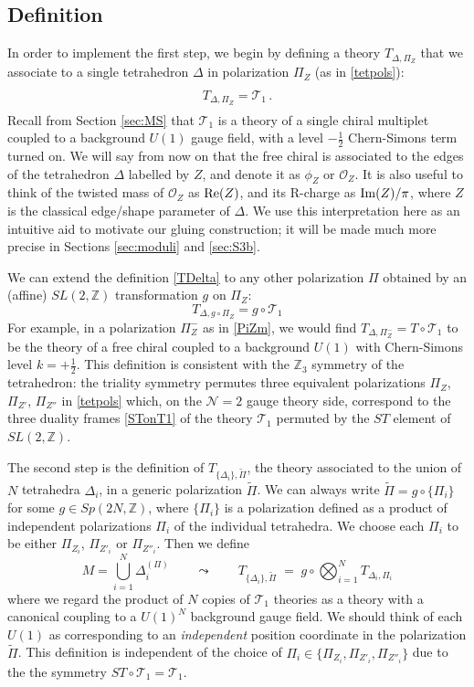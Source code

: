 \documentclass[hyper,letterpaper]{JHEP3}
\numberwithin{equation}{section}
\newcommand{\be}{\begin{equation}}
\newcommand{\ee}{\end{equation}}
\newcommand{\Z}{{\mathbb Z}}
\renewcommand{\Re}{{\rm Re}}
\renewcommand{\Im}{{\rm Im}}
\newcommand{\CN}{\mathcal{N}}
\newcommand{\CO}{\mathcal{O}}
\newcommand{\CT}{\mathcal{T}}
\begin{document}
\subsection{Definition}
\label{sec:defTM}

In order to implement the first step, we begin by defining a theory $T_{\Delta, \Pi_Z}$ that we associate to
a single tetrahedron $\Delta$ in polarization $\Pi_Z$ (as in \eqref{tetpols}):
\be
\boxed{\phantom{\int}
T_{\Delta, \Pi_Z} = \CT_1\,.
\phantom{\int}}
\label{TDelta}
\ee
%
Recall from Section \ref{sec:MS} that $\CT_1$ is a theory of a single chiral multiplet coupled to a background $U(1)$ gauge field, with a level $-\frac12$ Chern-Simons term turned on. We will say from now on that the free chiral is associated to the edges of the tetrahedron $\Delta$ labelled by $Z$, and denote it as $\phi_Z$ or $\CO_Z$. It is also useful to think of the twisted mass of $\CO_Z$ as $\Re(Z)$, and its R-charge as $\Im(Z)/\pi$, where $Z$ is the classical edge/shape parameter of $\Delta$. We use this interpretation here as an intuitive aid to motivate our gluing construction; it will be made much more precise in Sections \ref{sec:moduli} and \ref{sec:S3b}.


We can extend the definition \eqref{TDelta} to any other polarization $\Pi$ obtained by an (affine) $SL(2,\Z)$ transformation $g$ on $\Pi_Z$:
%
\be
T_{\Delta, g \circ \Pi_Z} = g \circ \CT_1 \label{TDeltaPi}
\ee
%
For example, in a polarization $\Pi_Z^-$ as in \eqref{PiZm}, we would find $T_{\Delta,\Pi_Z^-}=T\circ \CT_1$ to be the theory of a free chiral coupled to a background $U(1)$ with Chern-Simons level $k=+\frac12$.
This definition is consistent with the $\Z_3$ symmetry of the tetrahedron: the triality symmetry
permutes three equivalent polarizations $\Pi_{Z}$, $\Pi_{Z'}$, $\Pi_{Z''}$
in \eqref{tetpols} which, on the $\CN=2$ gauge theory side,
correspond to the three duality frames \eqref{STonT1} of the theory $\CT_1$ permuted
by the $ST$ element of $SL(2,\Z)$.

The second step is the definition of $T_{\{ \Delta_i\}, \tilde\Pi}$, the theory associated to
the union of $N$ tetrahedra $\Delta_i$, in a generic polarization $\tilde\Pi$.
We can always write $\tilde\Pi = g \circ \{ \Pi_i \}$ for some $g\in Sp(2N,\Z)$, where  $\{ \Pi_i \}$ is a polarization defined as a product of independent polarizations
$\Pi_i$ of the individual tetrahedra. We choose each $\Pi_i$ to be either $\Pi_{Z_i}$, $\Pi_{Z'_i}$ or $\Pi_{Z''_i}$.
Then we define
\be
\boxed{\phantom{\int}
M = \bigcup_{i=1}^N \Delta_i^{(\Pi)} \qquad \leadsto \qquad T_{ \{\Delta_i\} , \tilde\Pi} \; = \; g \circ \bigotimes_{i=1}^N T_{\Delta_i,\Pi_i}
\phantom{\int}}
\label{TMoutofTD}
\ee
where we regard the product of $N$ copies of $\CT_1$ theories as a theory with a canonical coupling to a $U(1)^N$ background gauge field. We should think of each $U(1)$ as corresponding to an \emph{independent} position coordinate in the polarization $\tilde \Pi$.
This definition is independent of the choice of $\Pi_i\in \{\Pi_{Z_i},\Pi_{Z'_i},\Pi_{Z''_i}\}$ due to the the symmetry $ST \circ \CT_1 = \CT_1$.
\end{document}
